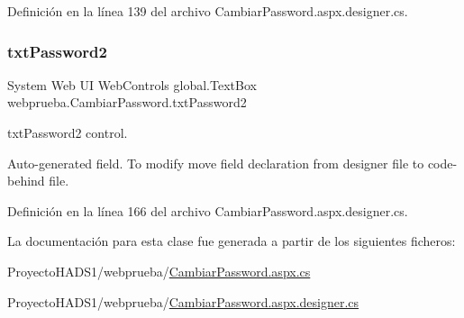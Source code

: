 Definición en la línea 139 del archivo Cambiar\+Password.\+aspx.\+designer.\+cs.

\mbox{\label{classwebprueba_1_1_cambiar_password_a9bfea087d5a804784fb94f218366b303}} 
\subsubsection{\texorpdfstring{txtPassword2}{txtPassword2}}
{\footnotesize\ttfamily System Web UI Web\+Controls global.\+Text\+Box webprueba.\+Cambiar\+Password.\+txt\+Password2\hspace{0.3cm}{\ttfamily [protected]}}



txt\+Password2 control. 

Auto-\/generated field. To modify move field declaration from designer file to code-\/behind file. 

Definición en la línea 166 del archivo Cambiar\+Password.\+aspx.\+designer.\+cs.



La documentación para esta clase fue generada a partir de los siguientes ficheros\+:\begin{DoxyCompactItemize}
\item 
Proyecto\+H\+A\+D\+S1/webprueba/\mbox{\hyperlink{_proyecto_h_a_d_s1_2webprueba_2_cambiar_password_8aspx_8cs}{Cambiar\+Password.\+aspx.\+cs}}\item 
Proyecto\+H\+A\+D\+S1/webprueba/\mbox{\hyperlink{_proyecto_h_a_d_s1_2webprueba_2_cambiar_password_8aspx_8designer_8cs}{Cambiar\+Password.\+aspx.\+designer.\+cs}}\end{DoxyCompactItemize}
